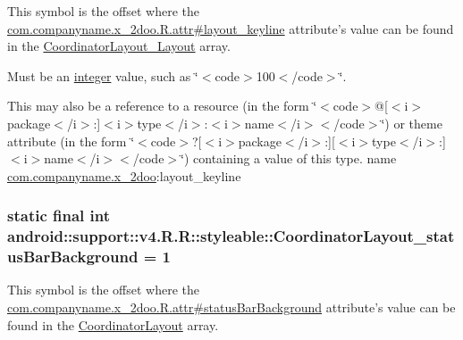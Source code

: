 This symbol is the offset where the \hyperlink{classcom_1_1companyname_1_1x__2doo_1_1_r_1_1attr_bf90169b6d22b8db2d59f854d9435899}{com.companyname.x\_\-2doo.R.attr\#layout\_\-keyline} attribute's value can be found in the \hyperlink{classandroid_1_1support_1_1v4_1_1_r_1_1styleable_002d98b0482bfb71440db629b16e17bf}{CoordinatorLayout\_\-Layout} array.

Must be an \hyperlink{classandroid_1_1support_1_1v4_1_1_r_1_1integer}{integer} value, such as \char`\"{}$<$code$>$100$<$/code$>$\char`\"{}. 

This may also be a reference to a resource (in the form \char`\"{}$<$code$>$@\mbox{[}$<$i$>$package$<$/i$>$:\mbox{]}$<$i$>$type$<$/i$>$:$<$i$>$name$<$/i$>$$<$/code$>$\char`\"{}) or theme attribute (in the form \char`\"{}$<$code$>$?\mbox{[}$<$i$>$package$<$/i$>$:\mbox{]}\mbox{[}$<$i$>$type$<$/i$>$:\mbox{]}$<$i$>$name$<$/i$>$$<$/code$>$\char`\"{}) containing a value of this type.  name \hyperlink{namespacecom_1_1companyname_1_1x__2doo}{com.companyname.x\_\-2doo}:layout\_\-keyline \hypertarget{classandroid_1_1support_1_1v4_1_1_r_1_1styleable_e232b9f25b14bea864d27c7645390f60}{
\subsubsection[{CoordinatorLayout\_\-statusBarBackground}]{\setlength{\rightskip}{0pt plus 5cm}static final int android::support::v4.R.R::styleable::CoordinatorLayout\_\-statusBarBackground = 1}}
\label{classandroid_1_1support_1_1v4_1_1_r_1_1styleable_e232b9f25b14bea864d27c7645390f60}


This symbol is the offset where the \hyperlink{classcom_1_1companyname_1_1x__2doo_1_1_r_1_1attr_960b032980954641be5fc38946339385}{com.companyname.x\_\-2doo.R.attr\#statusBarBackground} attribute's value can be found in the \hyperlink{classandroid_1_1support_1_1v4_1_1_r_1_1styleable_435a678f97c5e5874614dce39be62fcb}{CoordinatorLayout} array.

